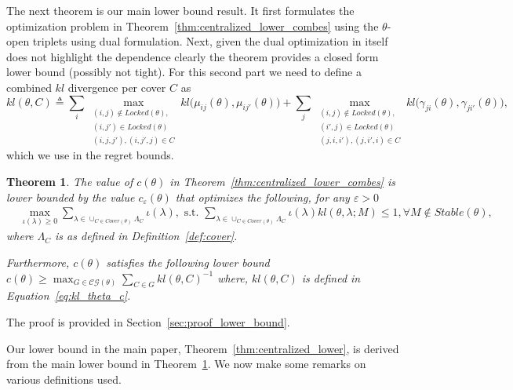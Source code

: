 \documentclass{article}
\newtheorem{theorem}{Theorem}[section]
\begin{document}
The next theorem is our main lower bound result. It first formulates the optimization problem in Theorem~\ref{thm:centralized_lower_combes} using the $\theta$-open triplets using dual formulation. Next, given the dual optimization in itself does not highlight the dependence clearly the theorem  provides a closed form lower bound (possibly not tight). For this second part we need to define a combined $kl$ divergence per cover $C$ as 
\begin{equation}\label{eq:kl_theta_c}
 kl(\theta, C) \triangleq\sum_{i}\max_{\substack{(i,j) \notin Locked(\theta),\\ (i,j')\in Locked(\theta)\\ (i,j,j'), (i,j',j) \in C}} kl\big( \mu_{ij}(\theta), \mu_{ij'}(\theta) \big) + \sum_{j}\max_{\substack{(i,j) \notin Locked(\theta),\\ (i',j)\in Locked(\theta)\\ (j,i,i'), (j,i',i) \in C}} kl\big(\gamma_{ji}(\theta), \gamma_{ji'}(\theta)\big),
\end{equation}
which we use in the regret bounds. 

\begin{theorem}\label{thm:centralized_lower_final}
The value of $c(\theta)$ in Theorem~\ref{thm:centralized_lower_combes} is lower bounded by the value $c_{\varepsilon}(\theta)$ that optimizes the following, for any $\varepsilon > 0$
\begin{align}
&\max_{\iota(\lambda) \geq 0} \sum_{\lambda \in \cup_{C \in Cover(\theta)}\Lambda_C}\iota(\lambda), \text{ s.t. }\sum_{\lambda \in \cup_{C \in Cover(\theta)}\Lambda_C}\iota(\lambda) kl(\theta, \lambda; M) \leq 1, \forall M \notin Stable(\theta),   \label{eq:lower_1} 
\end{align}
where  $\Lambda_C$ is as defined in Definition~\ref{def:cover}.

Furthermore, $c(\theta)$ satisfies the following lower bound
$c(\theta) \geq \max_{G \in \mathcal{CG}(\theta)}\sum_{C\in G} kl(\theta, C)^{-1}$
where, 
$kl(\theta, C)$ is defined in Equation~\eqref{eq:kl_theta_c}.
\end{theorem}
The proof is provided in Section~\ref{sec:proof_lower_bound}.


Our lower bound in the main paper, Theorem~\ref{thm:centralized_lower}, is derived from the main lower bound in Theorem~\ref{thm:centralized_lower_final}. 
We now make some remarks on various definitions used. 
\end{document}
